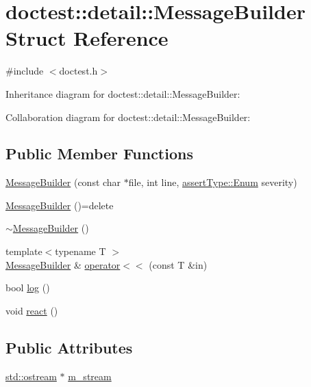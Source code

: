 \hypertarget{structdoctest_1_1detail_1_1_message_builder}{}\section{doctest\+:\+:detail\+:\+:Message\+Builder Struct Reference}
\label{structdoctest_1_1detail_1_1_message_builder}


{\ttfamily \#include $<$doctest.\+h$>$}



Inheritance diagram for doctest\+:\+:detail\+:\+:Message\+Builder\+:


Collaboration diagram for doctest\+:\+:detail\+:\+:Message\+Builder\+:
\subsection*{Public Member Functions}
\begin{DoxyCompactItemize}
\item 
\hyperlink{structdoctest_1_1detail_1_1_message_builder_a93cb6f180968d38cb0f18b08ec6c9000}{Message\+Builder} (const char $\ast$file, int line, \hyperlink{namespacedoctest_1_1assert_type_ae1bb5bed722f34f1c38b83cb19d326d3}{assert\+Type\+::\+Enum} severity)
\item 
\hyperlink{structdoctest_1_1detail_1_1_message_builder_aaaaf33f49c6d66425af9c2306010ae7e}{Message\+Builder} ()=delete
\item 
\hyperlink{structdoctest_1_1detail_1_1_message_builder_aa8dca00768780164f52e309276692f96}{$\sim$\+Message\+Builder} ()
\item 
{\footnotesize template$<$typename T $>$ }\\\hyperlink{structdoctest_1_1detail_1_1_message_builder}{Message\+Builder} \& \hyperlink{structdoctest_1_1detail_1_1_message_builder_ab9059f961c58179c998c89fc221ec804}{operator$<$$<$} (const T \&in)
\item 
bool \hyperlink{structdoctest_1_1detail_1_1_message_builder_a9bcc5d56e1764a7e07efebca55e43cce}{log} ()
\item 
void \hyperlink{structdoctest_1_1detail_1_1_message_builder_a3a65c5e39a0c04ae8e2a7c34997a2e4d}{react} ()
\end{DoxyCompactItemize}
\subsection*{Public Attributes}
\begin{DoxyCompactItemize}
\item 
\hyperlink{doctest_8h_a116af65cb5e924b33ad9d9ecd7a783f3}{std\+::ostream} $\ast$ \hyperlink{structdoctest_1_1detail_1_1_message_builder_a5319d522ba62c91e59ffa7f6982756e5}{m\+\_\+stream}
\end{DoxyCompactItemize}


